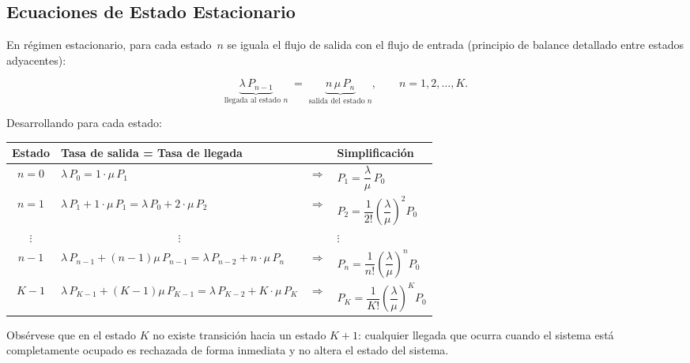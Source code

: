\documentclass[12pt,a4paper]{article}
\theoremstyle{definition}
\theoremstyle{plain}
\theoremstyle{remark}
\begin{document}
\subsection*{Ecuaciones de Estado Estacionario}

En r\'{e}gimen estacionario, para cada estado~$n$ se iguala el flujo de salida con el
flujo de entrada (principio de balance detallado entre estados adyacentes):

\[
\underbrace{\lambda\,P_{n-1}}_{\text{llegada al estado }n}
\;=\;
\underbrace{n\,\mu\,P_{n}}_{\text{salida del estado }n},
\qquad n = 1, 2, \ldots, K.
\]

Desarrollando para cada estado:

\begin{center}
\renewcommand{\arraystretch}{1.7}
\begin{tabular}{clcl}
\toprule
\textbf{Estado} & \textbf{Tasa de salida = Tasa de llegada} & & \textbf{Simplificaci\'{o}n} \\
\midrule
$n = 0$ & $\lambda\,P_0 = 1\cdot\mu\,P_1$
        & $\Longrightarrow$ & $P_1 = \dfrac{\lambda}{\mu}\,P_0$ \\[8pt]

$n = 1$ & $\lambda\,P_1 + 1\cdot\mu\,P_1 = \lambda\,P_0 + 2\cdot\mu\,P_2$
        & $\Longrightarrow$ & $P_2 = \dfrac{1}{2!}\!\left(\dfrac{\lambda}{\mu}\right)^{\!2}P_0$ \\[8pt]

$\vdots$ & \multicolumn{1}{c}{$\vdots$} & & $\vdots$ \\[2pt]


$n-1$ & $\lambda\,P_{n-1} + (n-1)\mu\,P_{n-1} = \lambda\,P_{n-2} + n\cdot\mu\,P_n$
        & $\Longrightarrow$ & $P_n = \dfrac{1}{n!}\!\left(\dfrac{\lambda}{\mu}\right)^{\!n}P_0$ \\[8pt]

$K-1$ & $\lambda\,P_{K-1} + (K-1)\mu\,P_{K-1} = \lambda\,P_{K-2} + K\cdot\mu\,P_K$
        & $\Longrightarrow$ & $P_K = \dfrac{1}{K!}\!\left(\dfrac{\lambda}{\mu}\right)^{\!K}P_0$ \\

\bottomrule
\end{tabular}
\end{center}

\noindent
Obs\'{e}rvese que en el estado $K$ no existe transición hacia un estado $K+1$:
cualquier llegada que ocurra cuando el sistema está completamente ocupado es
rechazada de forma inmediata y no altera el estado del sistema.
\end{document}

